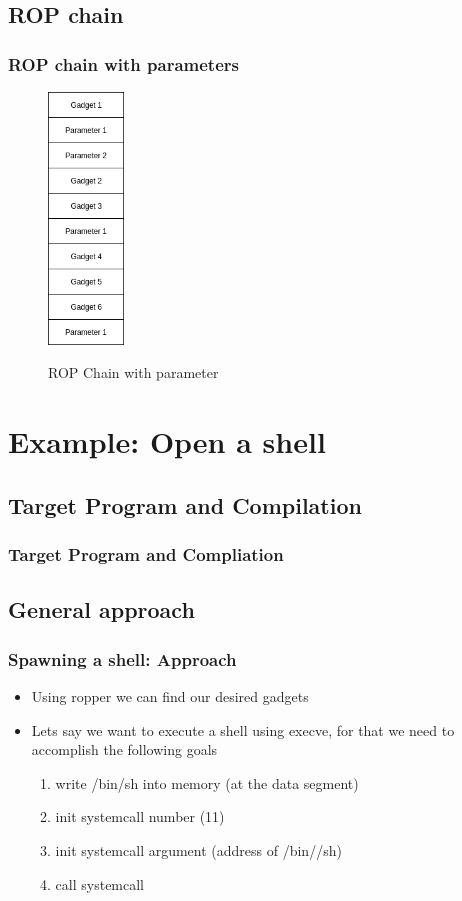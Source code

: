 \documentclass[11pt]{beamer}
\begin{document}
\subsection{ROP chain}
\begin{frame}
    \frametitle{ROP chain with parameters}
    \begin{figure}[h]
        \caption{ROP Chain with parameter}
        \centering
        \includegraphics[width=0.18\textwidth]{./img/gadgetstack.png}\label{gadget2}
    \end{figure}
\end{frame}

\section{Example: Open a shell}
\subsection{Target Program and Compilation}
\begin{frame}[fragile]
    \frametitle{Target Program and Compliation}
\end{frame}
\subsection{General approach}
\begin{frame}[fragile]
    \frametitle{Spawning a shell: Approach}
    \begin{itemize}
        \item Using ropper we can find our desired gadgets
        \item Lets say we want to execute a shell using execve, for that we need to accomplish the following goals
        \begin{enumerate}
            \item write /bin/sh into memory (at the data segment)
            \item init systemcall number (11)
            \item init systemcall argument (address of /bin//sh)
            \item call systemcall
        \end{enumerate}
    \end{itemize}
\end{frame}
\end{document}
